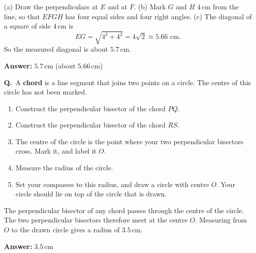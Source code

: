 \documentclass[12pt,a4paper]{article}
\newcounter{sol}
\newcommand{\s}{\refstepcounter{sol}\textbf{Q\thesol.}\ }
\newcommand{\ans}[1]{\par\smallskip\noindent\textbf{Answer:} #1\par}
\newcommand{\pt}[3]{\fill #1 circle (1.5pt); \node[inner sep=2pt,#2] at #1 {$#3$};}
\begin{document}
\begin{solbox}
(a) Draw the perpendiculars at \(E\) and at \(F\). (b) Mark \(G\) and \(H\) \(4\)\,cm from the line, so that \(EFGH\) has four equal sides and four right angles. (c) The diagonal of a square of side \(4\)\,cm is
\[
EG=\sqrt{4^2+4^2}=4\sqrt2\approx 5.66\text{ cm}.
\]
So the measured diagonal is about \(5.7\)\,cm.
\end{solbox}
\ans{\(5.7\)\,cm (about \(5.66\)\,cm)}

\begin{center}
\end{center}

\newpage

\s A \textbf{chord} is a line segment that joins two points on a circle. The centre of this circle has not been marked.
\begin{enumerate}
  \item Construct the perpendicular bisector of the chord \(PQ\).
  \item Construct the perpendicular bisector of the chord \(RS\).
  \item The centre of the circle is the point where your two perpendicular bisectors cross. Mark it, and label it \(O\).
  \item Measure the radius of the circle.
  \item Set your compasses to this radius, and draw a circle with centre \(O\). Your circle should lie on top of the circle that is drawn.
\end{enumerate}

\begin{solbox}
The perpendicular bisector of any chord passes through the centre of the circle. The two perpendicular bisectors therefore meet at the centre \(O\). Measuring from \(O\) to the drawn circle gives a radius of \(3.5\)\,cm.
\end{solbox}
\ans{\(3.5\)\,cm}

\begin{center}
\end{center}
\end{document}
